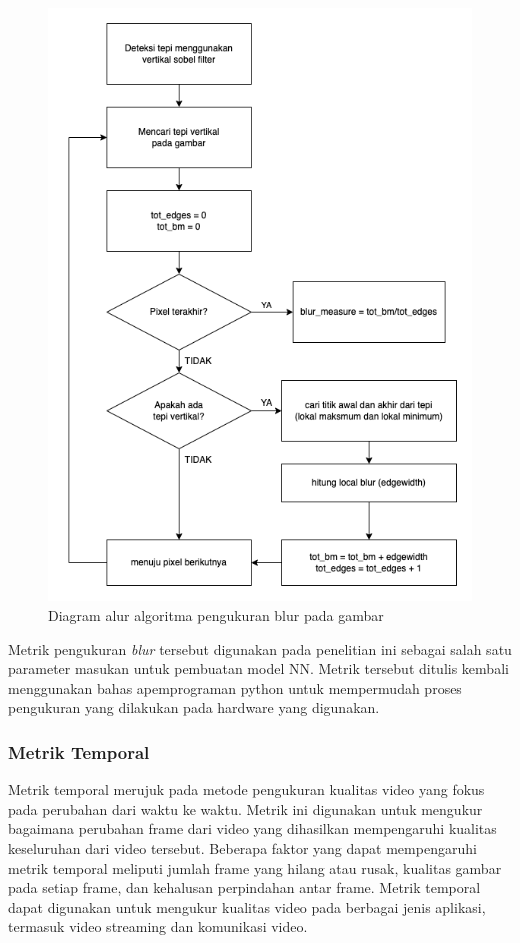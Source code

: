 \begin{figure}[H]
	\vspace{-0.1cm}
	\begin{center}
		\includegraphics[width=0.6\columnwidth]{bab3/Gambar/algoritma-blur.png}
	\end{center}
	\vspace{-0.2cm}
	\caption{Diagram alur algoritma pengukuran blur pada gambar \citep{Marziliano}} \label{algoritma-blur}
\end{figure}

Metrik pengukuran \textit{blur} tersebut digunakan pada penelitian ini sebagai salah satu parameter masukan untuk pembuatan model NN. Metrik tersebut ditulis kembali menggunakan bahas apemprograman python untuk mempermudah proses pengukuran yang dilakukan pada hardware yang digunakan.

\subsubsection{Metrik Temporal}
\hspace{1,2cm}
Metrik temporal merujuk pada metode pengukuran kualitas video yang fokus pada perubahan dari waktu ke waktu. Metrik ini digunakan untuk mengukur bagaimana perubahan frame dari video yang dihasilkan mempengaruhi kualitas keseluruhan dari video tersebut. Beberapa faktor yang dapat mempengaruhi metrik temporal meliputi jumlah frame yang hilang atau rusak, kualitas gambar pada setiap frame, dan kehalusan perpindahan antar frame. Metrik temporal dapat digunakan untuk mengukur kualitas video pada berbagai jenis aplikasi, termasuk video streaming dan komunikasi video.

